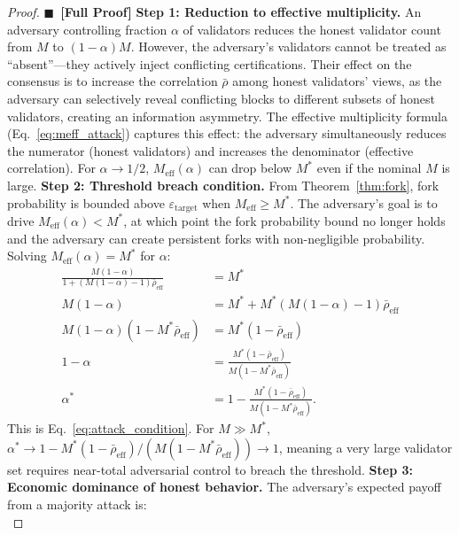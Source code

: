 \documentclass[11pt,a4paper]{article}
\theoremstyle{definition}
\newcommand{\rigorFull}[0]{$\blacksquare$~\textbf{[Full Proof]}}
\newcommand{\mthreshold}{M^{*}}
\begin{document}
\begin{proof}\rigorFull
\textbf{Step 1: Reduction to effective multiplicity.} An adversary controlling fraction $\alpha$ of validators reduces the honest validator count from $M$ to $(1 - \alpha)M$. However, the adversary's validators cannot be treated as ``absent''—they actively inject conflicting certifications. Their effect on the consensus is to increase the correlation $\bar{\rho}$ among honest validators' views, as the adversary can selectively reveal conflicting blocks to different subsets of honest validators, creating an information asymmetry.
The effective multiplicity formula (Eq.~\ref{eq:meff_attack}) captures this effect: the adversary simultaneously reduces the numerator (honest validators) and increases the denominator (effective correlation). For $\alpha \to 1/2$, $M_{\mathrm{eff}}(\alpha)$ can drop below $\mthreshold$ even if the nominal $M$ is large.
\textbf{Step 2: Threshold breach condition.} From Theorem~\ref{thm:fork}, fork probability is bounded above $\varepsilon_{\mathrm{target}}$ when $M_{\mathrm{eff}} \geq \mthreshold$. The adversary's goal is to drive $M_{\mathrm{eff}}(\alpha) < \mthreshold$, at which point the fork probability bound no longer holds and the adversary can create persistent forks with non-negligible probability.
Solving $M_{\mathrm{eff}}(\alpha) = \mthreshold$ for $\alpha$:
\begin{align}
    \frac{M(1-\alpha)}{1 + (M(1-\alpha) - 1)\bar{\rho}_{\mathrm{eff}}} &= \mthreshold \\
    M(1-\alpha) &= \mthreshold + \mthreshold (M(1-\alpha) - 1)\bar{\rho}_{\mathrm{eff}} \\
    M(1-\alpha)(1 - \mthreshold \bar{\rho}_{\mathrm{eff}}) &= \mthreshold(1 - \bar{\rho}_{\mathrm{eff}}) \\
    1 - \alpha &= \frac{\mthreshold(1 - \bar{\rho}_{\mathrm{eff}})}{M(1 - \mthreshold \bar{\rho}_{\mathrm{eff}})} \\
    \alpha^* &= 1 - \frac{\mthreshold(1 - \bar{\rho}_{\mathrm{eff}})}{M(1 - \mthreshold \bar{\rho}_{\mathrm{eff}})}.
\end{align}
This is Eq.~\eqref{eq:attack_condition}. For $M \gg \mthreshold$, $\alpha^* \to 1 - \mthreshold(1-\bar{\rho}_{\mathrm{eff}})/(M(1-\mthreshold \bar{\rho}_{\mathrm{eff}})) \to 1$, meaning a very large validator set requires near-total adversarial control to breach the threshold.
\textbf{Step 3: Economic dominance of honest behavior.} The adversary's expected payoff from a majority attack is:
\begin{equation}

\end{equation}
\end{proof}
\end{document}
